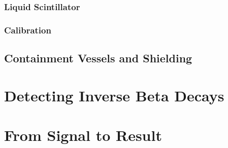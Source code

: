 \subsubsection{Liquid Scintillator}



\subsubsection{Calibration}


\subsection{Containment Vessels and Shielding}




\section{Detecting Inverse Beta Decays}

\section{From Signal to Result}


